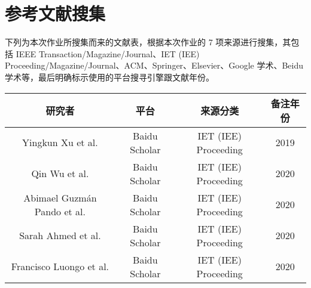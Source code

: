 \chapter{参考文献搜集}

下列为本次作业所搜集而来的文献表，根据本次作业的 7 项来源进行搜集，其包括 IEEE Transaction/Magazine/Journal、IET (IEE) Proceeding/Magazine/Journal、ACM、Springer、Elsevier、Google 学术、Beidu 学术等，最后明确标示使用的平台搜寻引擎跟文献年份。

\begin{center}
\begin{tabular}{cccc}
\hline
研究者 & 平台 & 来源分类 & 备注年份  \\
\hline
Yingkun Xu et al. \cite{yingkunxu2019} & Baidu Scholar & IET (IEE) Proceeding & 2019 \\
Qin Wu et al. \cite{qinwu2020} & Baidu Scholar & IET (IEE) Proceeding & 2020 \\
Abimael Guzmán Pando et al. \cite{abimael2020} & Baidu Scholar & IET (IEE) Proceeding & 2020 \\
Sarah Ahmed et al. \cite{sarahahmed2020} & Baidu Scholar & IET (IEE) Proceeding & 2020 \\
Francisco Luongo et al. \cite{franciscoluongo2020} & Baidu Scholar & IET (IEE) Proceeding & 2020 \\
\hline
\end{tabular}
\end{center}

